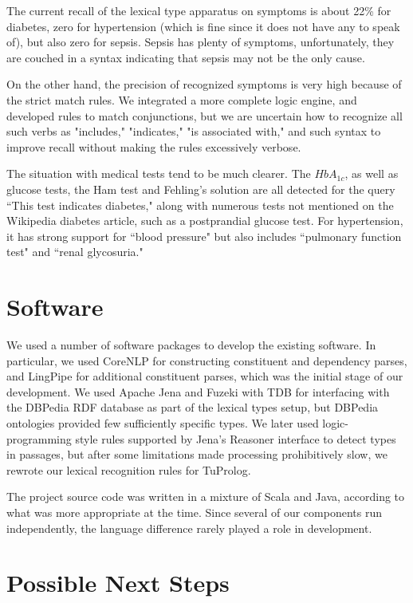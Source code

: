 \documentclass[12pt,letterpaper]{article}
\begin{document}
The current recall of the lexical type apparatus on symptoms is about 22\% for diabetes, zero for hypertension (which is fine since it does not have any to speak of), but also zero for sepsis. Sepsis has plenty of symptoms, unfortunately, they are couched in a syntax indicating that sepsis may not be the only cause.

On the other hand, the precision of recognized symptoms is very high because of the strict match rules. We integrated a more complete logic engine, and developed rules to match conjunctions, but we are uncertain how to recognize all such verbs as "includes," "indicates," "is associated with," and such syntax to improve recall without making the rules excessively verbose. 

The situation with medical tests tend to be much clearer. The $HbA_{1c}$, as well as glucose tests, the Ham test and Fehling's solution are all detected for the query ``This test indicates diabetes," along with numerous tests not mentioned on the Wikipedia diabetes article, such as a postprandial glucose test. For hypertension, it has strong support for ``blood pressure" but also includes ``pulmonary function test" and ``renal glycosuria."

\section{Software}

We used a number of software packages to develop the existing software. In particular, we used CoreNLP \cite{manning-EtAl:2014:P14-5} for constructing constituent and dependency parses, and LingPipe for additional constituent parses, which was the initial stage of our development.
We used Apache Jena and Fuzeki with TDB for interfacing with the DBPedia RDF database as part of the lexical types setup, but DBPedia ontologies provided few sufficiently specific types. We later used logic-programming style rules supported by Jena's Reasoner interface to detect types in passages, but after some limitations made processing prohibitively slow, we rewrote our lexical recognition rules for TuProlog. 

The project source code was written in a mixture of Scala and Java, according to what was more appropriate at the time. Since several of our components run independently, the language difference rarely played a role in development.

\section{Possible Next Steps}
\end{document}
